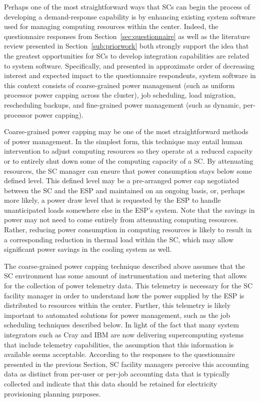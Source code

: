 Perhaps one of the most straightforward ways that SCs can begin the process of developing a demand-response
capability is by enhancing existing system software used for managing
computing resources within the center. Indeed, the questionnaire
responses from Section~\ref{sec:questionnaire} as well as the literature
review presented in Section~\ref{sub:priorwork} both strongly support the
idea that the greatest opportunities for SCs to
develop integration capabilities are related to system software.
Specifically, and presented in approximate order of decreasing
interest and expected impact to the questionnaire respondents, system
software in this context consists of coarse-grained power management
(such as uniform processor power capping across the cluster), 
job scheduling, load migration, rescheduling backups, and fine-grained 
power management (such as dynamic, per-processor power capping).

Coarse-grained power capping may be one of the most straightforward
methods of power management. In the simplest form, this technique may
entail human intervention to adjust computing resources so they
operate at a reduced capacity or to entirely shut down some of the
computing capacity of a SC. By attenuating
resources, the SC manager can ensure that power
consumption stays below some defined level. This defined level may be
a pre-arranged power cap negotiated between the SC
and the ESP and maintained on an ongoing basis,
or, perhaps more likely, a power draw level that is requested by the
ESP to handle unanticipated loads somewhere else
in the ESP's system. 
Note that the savings
in power may not need to come entirely from attenuating computing
resources. Rather, reducing power consumption in computing resources
is likely to result in a corresponding reduction in thermal load
within the SC, which
may allow significant power savings in the cooling system as well.

The coarse-grained power capping technique described above assumes
that the SC environment has some amount of
instrumentation and metering that allows for the collection of power
telemetry data. This telemetry is necessary for the SC facility manager in order to understand how the power supplied
by the ESP is distributed to resources within the
center. Further, this telemetry is likely important to automated
solutions for power management, such as the job scheduling techniques
described below. In light of the fact that many system integrators
such as Cray and IBM are now delivering supercomputing systems that
include telemetry capabilities, the assumption that this information
is available seems acceptable. According to the responses to the
questionnaire presented in the previous Section, SC
facility managers perceive this accounting data as distinct from
per-user or per-job accounting data that is typically collected and
indicate that this data should be retained for electricity
provisioning planning purposes.

